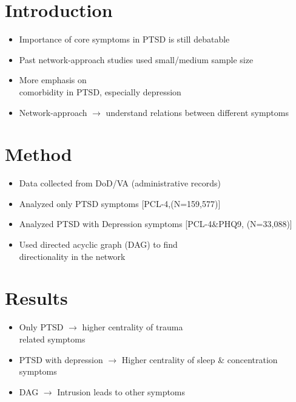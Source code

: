 \documentclass[]{betterposter}
\begin{document}
{

\section{Introduction}
\begin{itemize}
\item Importance of core symptoms in PTSD is still debatable
\item Past network-approach studies used small/medium sample size
\item More emphasis on\\ comorbidity in PTSD, especially depression
\item Network-approach $\rightarrow$ understand relations between different symptoms
\end{itemize}

\section{Method}
\begin{itemize}
\item Data collected from DoD/VA (administrative records)
\item Analyzed only PTSD symptoms [PCL-4,(N=159,577)]
\item Analyzed PTSD with Depression symptoms [PCL-4\&PHQ9, (N=33,088)]
\item Used directed acyclic graph (DAG) to find \\directionality in the network
\end{itemize}


\section{Results}
\begin{itemize}
    \item Only PTSD $\rightarrow$ higher centrality of trauma\\ related symptoms
    \item PTSD with depression $\rightarrow$ Higher centrality of sleep \& concentration symptoms
    \item DAG $\rightarrow$ Intrusion leads to other symptoms
\end{itemize}

}
\end{document}
